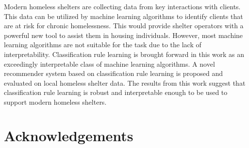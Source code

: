 \documentclass{ucalgarythesis}
\theoremstyle{plain}
\theoremstyle{definition}
\begin{document}

  \begin{thesisabstract}  
    Modern homeless shelters are collecting data from key interactions with clients. This data can be utilized by machine learning algorithms to identify clients that are at risk for chronic homelessness. This would provide shelter operators with a powerful new tool to assist them in housing individuals. However, most machine learning algorithms are not suitable for the task due to the lack of interpretability. Classification rule learning is brought forward in this work as an exceedingly interpretable class of machine learning algorithms.
A novel recommender system based on classification rule learning is proposed and evaluated on local homeless shelter data. The results from this work suggest that classification rule learning is robust and interpretable enough to be used to support modern homeless shelters.
  \end{thesisabstract}




% 
 
   
 

  \chapter{Acknowledgements}  
\end{document}
